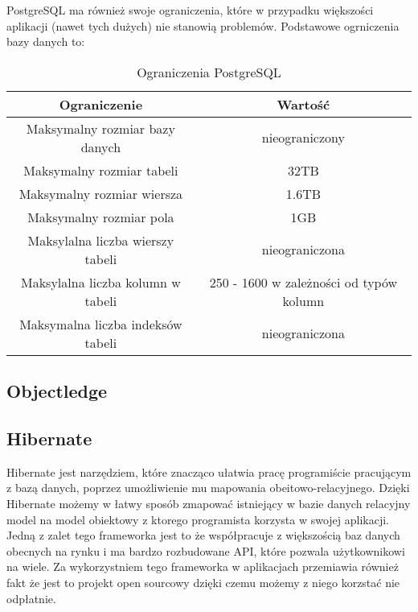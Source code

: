 PostgreSQL ma również swoje ograniczenia, które w przypadku większości aplikacji (nawet tych dużych)
nie stanowią problemów. Podstawowe ogrniczenia bazy danych to:
\begin{table}[h]\centering
\caption{Ograniczenia PostgreSQL}
\label{postgresOrganiczeniaTable}
\begin{tabular}{|c||c|}
 \hline \textbf{Ograniczenie} & \textbf{Wartość} \\
 
 \hline
 \hline Maksymalny rozmiar bazy danych & nieograniczony \\
 \hline Maksymalny rozmiar tabeli & 32TB\\
 \hline Maksymalny rozmiar wiersza & 1.6TB\\
 \hline Maksymalny rozmiar pola & 1GB\\
 \hline Maksylalna liczba wierszy tabeli & nieograniczona\\
 \hline Maksylalna liczba kolumn w tabeli & 250 - 1600 w zależności od typów kolumn\\
 \hline Maksymalna liczba indeksów tabeli & nieograniczona\\ 
 \hline
\end{tabular}
\end{table}

\subsection{Objectledge}
\subsection{Hibernate}
Hibernate jest narzędziem, które znacząco ułatwia pracę programiście pracującym z bazą danych, poprzez 
umożliwienie mu mapowania obeitowo-relacyjnego. 
Dzięki Hibernate możemy w łatwy sposób zmapować istniejący w bazie danych relacyjny model na model obiektowy
z ktorego programista korzysta w swojej aplikacji. Jedną z zalet tego frameworka jest to że współpracuje 
z większością baz danych obecnych na rynku i ma bardzo rozbudowane API, które pozwala użytkownikowi na wiele.
Za wykorzystniem tego frameworka w aplikacjach przemiawia również fakt że jest to projekt open sourcowy dzięki
czemu możemy z niego korzstać nie odpłatnie.

